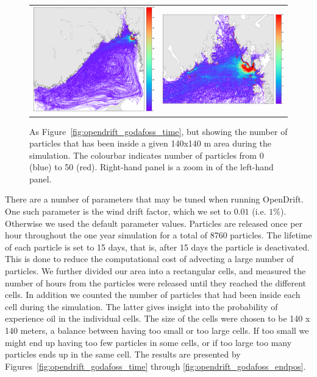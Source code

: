 \begin{figure}[htb]
  \begin{center}
    \begin{tabular}{cc}
      \includegraphics*[width=7.2cm]{Figurer/opendrift/opendrift_godafoss_consentration_crop}  & \includegraphics*[width=7.2cm]{Figurer/opendrift/opendrift_godafoss_consentration_zoom_crop}\\ 
    \end{tabular}
    \caption{\small As Figure~\ref{fig:opendrift_godafoss_time}, but showing the number of particles that has been inside a given 140x140 m area during the simulation. The colourbar indicates number of particles from 0 (blue) to 50 (red). Right-hand panel is a zoom in of the left-hand panel.}
    \label{fig:opendrift_godafoss_conc}
  \end{center}
\end{figure}

There are a number of parameters that may be tuned when running OpenDrift. One such parameter is the wind drift factor, which we set to $0.01$ (i.e. $1\%$). Otherwise we used the default parameter values. Particles are released once per hour throughout the one year simulation for a total of 8760 particles. The lifetime of each particle is set to 15 days, that is, after 15 days the particle is deactivated. This is done to reduce the computational cost of advecting a large number of particles. We further divided our area into a rectangular cells, and measured the number of hours from the particles were released until they reached the different cells. In addition we counted the number of particles that had been inside each cell during the simulation. The latter gives insight into the probability of experience oil in the individual cells. The size of the cells were chosen to be 140 x 140 meters, a balance between having too small or too large cells. If too small we might end up having too few particles in some cells, or if too large too many particles ends up in the same cell. The results are presented by Figures~\ref{fig:opendrift_godafoss_time} through \ref{fig:opendrift_godafoss_endpos}.

